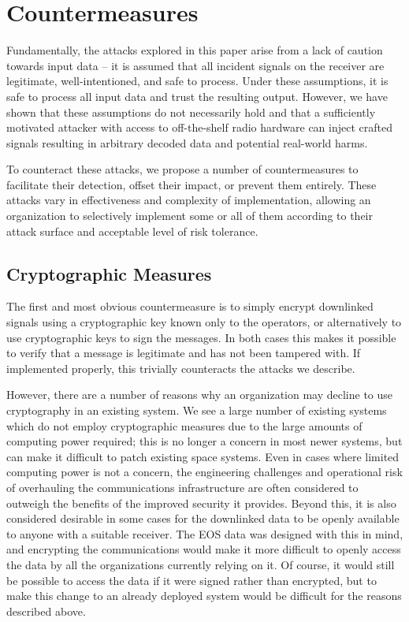 \section{Countermeasures}\label{sec:countermeasures}

Fundamentally, the attacks explored in this paper arise from a lack of caution towards input data -- it is assumed that all incident signals on the receiver are legitimate, well-intentioned, and safe to process.
Under these assumptions, it is safe to process all input data and trust the resulting output.
However, we have shown that these assumptions do not necessarily hold and that a sufficiently motivated attacker with access to off-the-shelf radio hardware can inject crafted signals resulting in arbitrary decoded data and potential real-world harms.

To counteract these attacks, we propose a number of countermeasures to facilitate their detection, offset their impact, or prevent them entirely.
These attacks vary in effectiveness and complexity of implementation, allowing an organization to selectively implement some or all of them according to their attack surface and acceptable level of risk tolerance.


\subsection{Cryptographic Measures}

The first and most obvious countermeasure is to simply encrypt downlinked signals using a cryptographic key known only to the operators, or alternatively to use cryptographic keys to sign the messages.
In both cases this makes it possible to verify that a message is legitimate and has not been tampered with.
If implemented properly, this trivially counteracts the attacks we describe.

However, there are a number of reasons why an organization may decline to use cryptography in an existing system.
We see a large number of existing systems which do not employ cryptographic measures due to the large amounts of computing power required; this is no longer a concern in most newer systems, but can make it difficult to patch existing space systems.
Even in cases where limited computing power is not a concern, the engineering challenges and operational risk of overhauling the communications infrastructure are often considered to outweigh the benefits of the improved security it provides.
Beyond this, it is also considered desirable in some cases for the downlinked data to be openly available to anyone with a suitable receiver.
The EOS data was designed with this in mind, and encrypting the communications would make it more difficult to openly access the data by all the organizations currently relying on it.
Of course, it would still be possible to access the data if it were signed rather than encrypted, but to make this change to an already deployed system would be difficult for the reasons described above.

